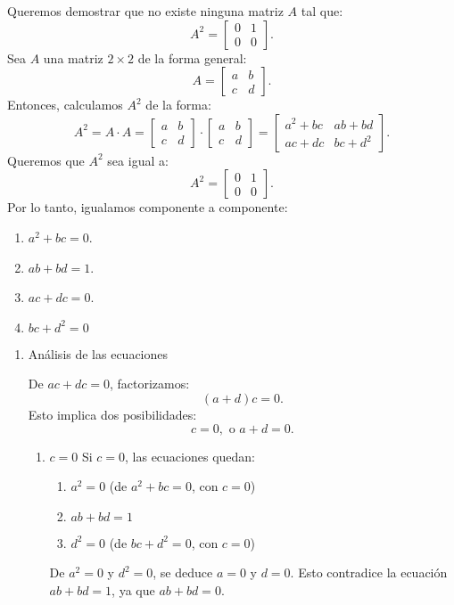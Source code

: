 \begin{enumerate}[label=\color{red}\textbf{\arabic*)}]
Queremos demostrar que no existe ninguna matriz $A$ tal que: \[
A^2=\begin{bmatrix} 
    0 & 1\\
    0 & 0
\end{bmatrix} .
\] 
Sea $A$ una matriz $2\times 2$ de la forma general: \[
A=\begin{bmatrix} 
    a & b \\
    c & d
\end{bmatrix} .
\] 
Entonces, calculamos $A^2$ de la forma: \[
A^2=A\cdot A=\begin{bmatrix} 
    a & b\\
    c & d
\end{bmatrix} \cdot \begin{bmatrix} 
    a & b\\
    c & d
\end{bmatrix} =\begin{bmatrix} 
    a^2+bc & ab+bd\\
    ac+dc & bc+d^2
\end{bmatrix} .
\] 
Queremos que $A^2$ sea igual a: \[
A^2=\begin{bmatrix} 
    0 & 1\\
    0 & 0
\end{bmatrix} .
\] 
Por lo tanto, igualamos componente a componente:
\begin{enumerate}[label=\arabic*)]
    \item $a^2+bc=0$.
    \item $ab+bd=1$.
    \item  $ac+dc=0$.
    \item  $bc+d^2=0$
\end{enumerate}
\begin{enumerate}[label=Paso \arabic*:]
    \item Análisis de las ecuaciones

        De $ac+dc=0$, factorizamos:  \[
            (a+d)c=0.
        \]
        Esto implica dos posibilidades: \[
        c=0,\text{ o }a+d=0.
        \] 
        \begin{enumerate}[label=Caso \arabic*:]
            \item $c=0$
                Si $c=0$, las ecuaciones quedan:
                \begin{enumerate}[label=\arabic*.]
                    \item $a^2=0$ (de $a^2+bc=0$, con $c=0$)
                    \item $ab+bd=1$
                    \item  $d^2=0$ (de $bc+d^2=0$, con $c=0$)
                \end{enumerate}
                De $a^2=0$ y $d^2=0$, se deduce $a=0$ y $d=0$. Esto contradice la ecuación $ab+bd=1$, ya que  $ab+bd=0$.


\end{enumerate}
\end{enumerate}
\end{enumerate}
